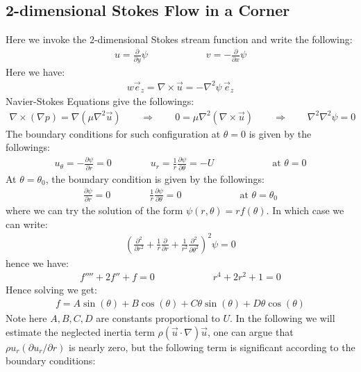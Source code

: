 \documentclass[11pt]{book}
\theoremstyle{break}
\theoremstyle{break}
\newcommand{\pd}{\partial}
\begin{document}
\subsection{2-dimensional Stokes Flow in a Corner}
Here we invoke the $2$-dimensional Stokes stream function and write the following:
\begin{align*}
u = \frac{\pd}{\pd y}\psi \qquad\qquad\qquad v = -\frac{\pd}{\pd x}\psi
\end{align*}
Here we have:
\begin{align*}
w \vec{e}_z = \nabla\times \vec{u} = -\nabla^2 \psi \, \vec{e}_z
\end{align*}
Navier-Stokes Equations give the followings:
\begin{align*}
\nabla \times \left( \nabla p\right) = \nabla \left( \mu \nabla^2 \vec{u}\right) \qquad \Rightarrow \qquad 0 = \mu \nabla^2 \left( \nabla \times \vec{u}\right) \qquad \Rightarrow \qquad \nabla^2 \nabla^2 \psi = 0
\end{align*}
The boundary conditions for such configuration at $\theta = 0$ is given by the followings:
\begin{align*}
u_{\theta} = -\frac{\pd \psi}{\pd r} = 0 \qquad\qquad u_r = \frac{1}{r}\frac{\pd \psi}{\pd \theta} = -U  \qquad\qquad\qquad \text{at } \theta = 0
\end{align*}
At $\theta = \theta_0$, the boundary condition is given by the followings:
\begin{align*}
\frac{\pd\psi}{\pd r} = 0 \qquad\qquad \frac{1}{r}\frac{\pd \psi}{\pd \theta} = 0 \qquad\qquad\qquad \text{at }\theta = \theta_0
\end{align*}
where we can try the solution of the form $\psi(r,\theta) = rf(\theta)$. In which case we can write:
\begin{align*}
\left( \frac{\pd^2}{\pd r^2}+ \frac{1}{r}\frac{\pd}{\pd r}+ \frac{1}{r^2}\frac{\pd^2}{\pd \theta^2}\right)^2 \psi = 0
\end{align*}
hence we have:
\begin{align*}
f'''' + 2f'' + f = 0 \qquad\qquad\qquad r^4 + 2r^2 + 1 = 0
\end{align*}
Hence solving we get:
\begin{align*}
f = A\sin(\theta) + B\cos(\theta) + C\theta \sin(\theta) + D\theta \cos(\theta)
\end{align*}
Note here $A,B,C,D$ are constants proportional to $U$. In the following we will estimate the neglected inertia term $\rho(\vec{u}\cdot \nabla)\vec{u}$, one can argue that $\rho u_r (\pd u_r/\pd r)$ is nearly zero, but the following term is significant according to the boundary conditions:
\end{document}
